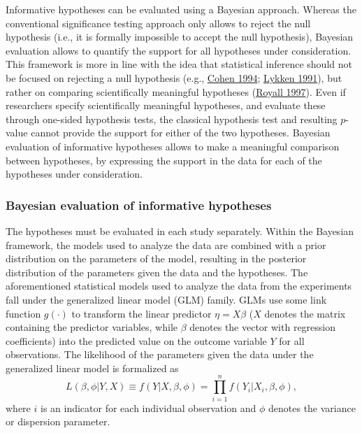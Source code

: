 \documentclass[
  11pt,
]{article}
\begin{document}
Informative hypotheses can be evaluated using a Bayesian approach.
Whereas the conventional significance testing approach only allows to reject the null hypothesis (i.e., it is formally impossible to accept the null hypothesis), Bayesian evaluation allows to quantify the support for all hypotheses under consideration.
This framework is more in line with the idea that statistical inference should not be focused on rejecting a null hypothesis (e.g., \protect\hyperlink{ref-cohen_earth_1994}{Cohen 1994}; \protect\hyperlink{ref-lykken_wrong_1991}{Lykken 1991}), but rather on comparing scientifically meaningful hypotheses (\protect\hyperlink{ref-royall1997statistical}{Royall 1997}).
Even if researchers specify scientifically meaningful hypotheses, and evaluate these through one-sided hypothesis tests, the classical hypothesis test and resulting \(p\)-value cannot provide the support for either of the two hypotheses.
Bayesian evaluation of informative hypotheses allows to make a meaningful comparison between hypotheses, by expressing the support in the data for each of the hypotheses under consideration.

\hypertarget{bayesian-evaluation-of-informative-hypotheses}{%
\subsubsection{Bayesian evaluation of informative hypotheses}\label{bayesian-evaluation-of-informative-hypotheses}}

The hypotheses must be evaluated in each study separately.
Within the Bayesian framework, the models used to analyze the data are combined with a prior distribution on the parameters of the model, resulting in the posterior distribution of the parameters given the data and the hypotheses.
The aforementioned statistical models used to analyze the data from the experiments fall under the generalized linear model (GLM) family.
GLMs use some link function \(g(\cdot)\) to transform the linear predictor \(\eta = X\beta\) (\(X\) denotes the matrix containing the predictor variables, while \(\beta\) denotes the vector with regression coefficients) into the predicted value on the outcome variable \(Y\) for all observations.
The likelihood of the parameters given the data under the generalized linear model is formalized as
\[
L(\beta, \phi | Y, X) \equiv f(Y|X, \beta, \phi) = \prod^n_{i=1} f(Y_i | X_i, \beta, \phi),
\]
where \(i\) is an indicator for each individual observation and \(\phi\) denotes the variance or dispersion parameter.
\end{document}
